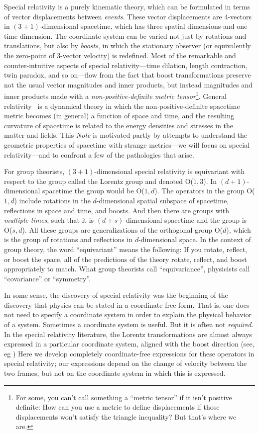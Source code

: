 \documentclass{article}
\newcommand{\plus}{\!+\!} %
\newcommand{\documentname}{\textsl{Note}}
\begin{document}
Special relativity \cite{sr} is a purely kinematic theory, which can be formulated in terms of vector displacements between \emph{events}.
These vector displacements are 4-vectors in $(3\plus1)$-dimensional spacetime, which has three spatial dimensions and one time dimension.
The coordinate system can be varied not just by rotations and translations, but also by \emph{boosts}, in which the stationary observer (or equivalently the zero-point of 3-vector velocity) is redefined.
Most of the remarkable and counter-intuitive aspects of special relativity---time dilation, length contraction, twin paradox, and so on---flow from the fact that boost transformations preserve not the usual vector magnitudes and inner products, but instead magnitudes and inner products made with a \emph{non-positive-definite metric tensor}\footnote{For some, you can't call something a ``metric tensor'' if it isn't positive definite: How can you use a metric to define displacements if those displacements won't satisfy the triangle inequality? But that's where we are.}.
General relativity~\cite{gr} is a dynamical theory in which the non-positive-definite spacetime metric becomes (in general) a function of space and time, and the resulting curvature of spacetime is related to the energy densities and stresses in the matter and fields.
This \documentname{} is motivated partly by attempts to understand the geometric properties of spacetime with strange metrics---we will focus on special relativity---and to confront a few of the pathologies that arise.

For group theorists, $(3\plus1)$-dimensional special relativity is equivariant with respect to the group called the Lorentz group and denoted O($1,3$).
In $(d\plus1)$-dimensional spacetime the group would be O($1,d$).
The operators in the group O($1,d$) include rotations in the $d$-dimensional spatial subspace of spacetime, reflections in space and time, and boosts.
And then there are groups with \emph{multiple times}, such that it is $(d\plus s)$-dimensional spacetime and the group is O($s,d$).
All these groups are generalizations of the orthogonal group O($d$), which is the group of rotations and reflections in $d$-dimensional space.
In the context of group theory, the word ``equivariant'' means the following:
If you rotate, reflect, or boost the space, all of the predictions of the theory rotate, reflect, and boost appropriately to match.
What group theorists call ``equivariance'', physicists call ``covariance'' or ``symmetry''.

In some sense, the discovery of special relativity was the beginning of the discovery that physics can be stated in a coordinate-free form.
That is, one does not need to specify a coordinate system in order to explain the physical behavior of a system.
Sometimes a coordinate system is useful.
But it is often not \emph{required}.
In the special relativity literature, the Lorentz transformations are almost always expressed in a particular coordinate system, aligned with the boost direction (see, eg \cite{foo})
Here we develop completely coordinate-free expressions for these operators in special relativity; our expressions depend on the change of velocity between the two frames, but not on the coordinate system in which this is expressed.
\end{document}
